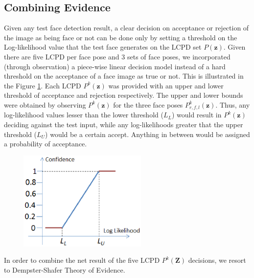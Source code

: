 \documentclass[times, 10pt,twocolumn]{article}
\begin{document}
\subsection{Combining Evidence}\label{CombiningEvidence}
Given any test face detection result, a clear decision on acceptance
or rejection of the image as being face or not can be done only by
setting a threshold on the Log-likelihood value that the test face
generates on the LCPD set $P(\mathbf z)$. Given there are five LCPD
per face pose and $3$ sets of face poses, we incorporated (through
observation) a piece-wise linear decision model instead of a hard
threshold on the acceptance of a face image as true or not. This is
illustrated in the Figure \ref{Fig:Thresholds}. Each LCPD
$P^k(\mathbf z)$ was provided with an upper and lower threshold of
acceptance and rejection respectively. The upper and lower bounds
were obtained by observing $P^k(\mathbf z)$ for the three face poses
$P^k_{r,f,l}(\mathbf z)$. Thus, any log-likelihood values lesser
than the lower threshold ($L_L$) would result in $P^k(\mathbf z)$
deciding against the test input, while any log-likelihoods greater
that the upper threshold ($L_U$) would be a certain accept. Anything
in between would be assigned a probability of acceptance.
\begin{figure}[h]
\centering
\hspace{-0.3in}\includegraphics[width=2.5in]{Figure11.eps}
\caption{{\bf {\selectfont }}}
\label{Fig:Thresholds}
\end{figure}
In order to combine the net result of the five LCPD $P^k(\mathbf Z)$
decisions, we resort to Dempster-Shafer Theory of Evidence.
\end{document}
